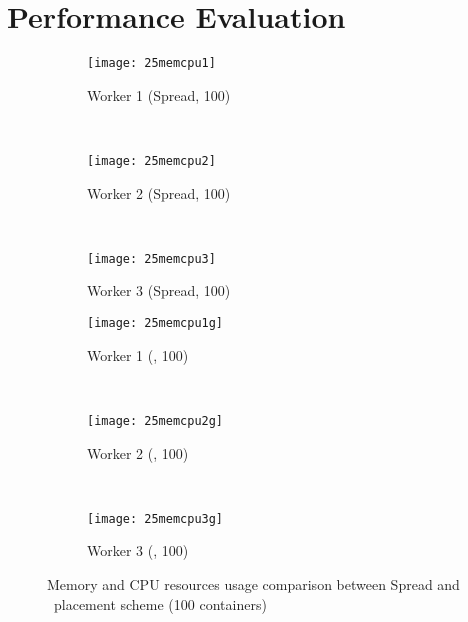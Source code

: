 \section{Performance Evaluation}

\begin{figure*}[ht]
   \centering
      \begin{subfigure}[t]{0.32\linewidth}
\centering
      \texttt{[image: 25memcpu1]}
      \vspace{-0.15in}
      \caption{Worker 1 (Spread, 100)}
      \label{fig:25worker1}
      \end{subfigure} %
      ~%
      \begin{subfigure}[t]{0.32\linewidth}
\centering
      \texttt{[image: 25memcpu2]}
      \vspace{-0.15in}
      \caption{Worker 2 (Spread, 100)}
      \label{fig:25worker2}
      \end{subfigure} %
      ~
      \begin{subfigure}[t]{0.32\linewidth}
\centering
      \texttt{[image: 25memcpu3]}
      \vspace{-0.15in}
      \caption{Worker 3 (Spread, 100)}
      \label{fig:25worker3}
      \end{subfigure} %
      
   \centering
      \begin{subfigure}[t]{0.32\linewidth}
\centering
      \texttt{[image: 25memcpu1g]}
      \vspace{-0.15in}
      \caption{Worker 1 (\sol, 100)}
      \label{fig:25worker1g}
      \end{subfigure} %
      ~%
      \begin{subfigure}[t]{0.32\linewidth}
\centering
      \texttt{[image: 25memcpu2g]}
      \vspace{-0.15in}
      \caption{Worker 2 (\sol, 100)}
      \label{fig:25worker2g}
      \end{subfigure} %
      ~
      \begin{subfigure}[t]{0.32\linewidth}
\centering
      \texttt{[image: 25memcpu3g]}
      \vspace{-0.15in}
      \caption{Worker 3 (\sol, 100)}
      \label{fig:25worker3g}
      \end{subfigure} %
      
\caption{Memory and CPU resources usage comparison between Spread and \sol~placement scheme (100 containers)}
\label{fig:noworkload25}
\end{figure*}

